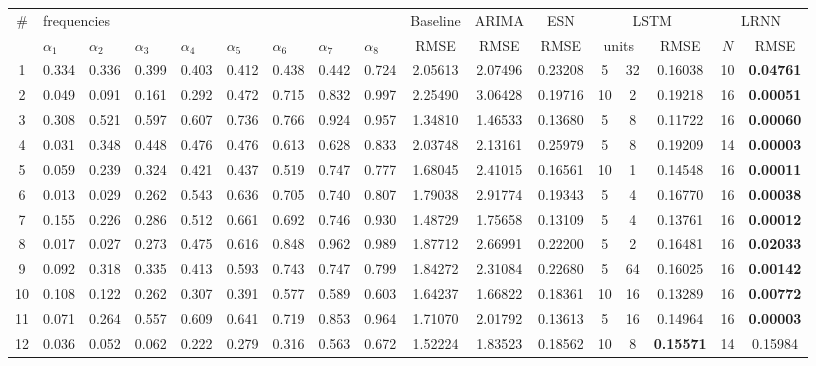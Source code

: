 \documentclass{sn-jnl}
\theoremstyle{definition}
\begin{document}
\begin{table}
  \centering
  \begin{tabular}{c*{8}{p{8mm}}cccc@{\,+\,}cccc}
     \toprule
	\# & \multicolumn{8}{l}{frequencies} & Baseline & ARIMA & ESN & \multicolumn{3}{c}{LSTM} & \multicolumn{2}{c}{LRNN}\\
	& $\alpha_1$ & $\alpha_2$ & $\alpha_3$ & $\alpha_4$ & $\alpha_5$ & $\alpha_6$ & $\alpha_7$ & $\alpha_8$ & RMSE & RMSE & RMSE & \multicolumn{2}{c}{units} & RMSE & $N$ & RMSE\\ \midrule
	1 & 0.334 & 0.336 & 0.399 & 0.403 & 0.412 & 0.438 & 0.442 & 0.724 & 2.05613 & 2.07496 & 0.23208 & 5 & 32 & 0.16038 & 10 & \textbf{0.04761}\\
	2 & 0.049 & 0.091 & 0.161 & 0.292 & 0.472 & 0.715 & 0.832 & 0.997 & 2.25490 & 3.06428 & 0.19716 & 10 & 2 & 0.19218 & 16 & \textbf{0.00051}\\
	3 & 0.308 & 0.521 & 0.597 & 0.607 & 0.736 & 0.766 & 0.924 & 0.957 & 1.34810 & 1.46533 & 0.13680 & 5 & 8 & 0.11722 & 16 & \textbf{0.00060}\\
	4 & 0.031 & 0.348 & 0.448 & 0.476 & 0.476 & 0.613 & 0.628 & 0.833 & 2.03748 & 2.13161 & 0.25979 & 5 & 8 & 0.19209 & 14 & \textbf{0.00003}\\
	5 & 0.059 & 0.239 & 0.324 & 0.421 & 0.437 & 0.519 & 0.747 & 0.777 & 1.68045 & 2.41015 & 0.16561 & 10 & 1 & 0.14548 & 16 & \textbf{0.00011}\\
	6 & 0.013 & 0.029 & 0.262 & 0.543 & 0.636 & 0.705 & 0.740 & 0.807 & 1.79038 & 2.91774 & 0.19343 & 5 & 4 & 0.16770 & 16 & \textbf{0.00038}\\
	7 & 0.155 & 0.226 & 0.286 & 0.512 & 0.661 & 0.692 & 0.746 & 0.930 & 1.48729 & 1.75658 & 0.13109 & 5 & 4 & 0.13761 & 16 & \textbf{0.00012}\\
	8 & 0.017 & 0.027 & 0.273 & 0.475 & 0.616 & 0.848 & 0.962 & 0.989 & 1.87712 & 2.66991 & 0.22200 & 5 & 2 & 0.16481 & 16 & \textbf{0.02033}\\
	9 & 0.092 & 0.318 & 0.335 & 0.413 & 0.593 & 0.743 & 0.747 & 0.799 & 1.84272 & 2.31084 & 0.22680 & 5 & 64 & 0.16025 & 16 & \textbf{0.00142}\\
	10 & 0.108 & 0.122 & 0.262 & 0.307 & 0.391 & 0.577 & 0.589 & 0.603 & 1.64237 & 1.66822 & 0.18361 & 10 & 16 & 0.13289 & 16 & \textbf{0.00772}\\
	11 & 0.071 & 0.264 & 0.557 & 0.609 & 0.641 & 0.719 & 0.853 & 0.964 & 1.71070 & 2.01792 & 0.13613 & 5 & 16 & 0.14964 & 16 & \textbf{0.00003}\\
	12 & 0.036 & 0.052 & 0.062 & 0.222 & 0.279 & 0.316 & 0.563 & 0.672 & 1.52224 & 1.83523 & 0.18562 & 10 & 8 & \textbf{0.15571} & 14 & 0.15984\\

\end{tabular}
\end{table}
\end{document}
